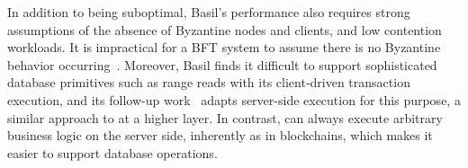 In addition to being suboptimal, Basil's performance also requires strong assumptions of the absence of Byzantine nodes and clients, and low contention workloads.
It is impractical for a BFT system to assume there is no Byzantine behavior occurring~\cite{bft-bft}.
 
Moreover, Basil finds it difficult to support sophisticated database primitives such as range reads with its client-driven transaction execution, and its follow-up work~\cite{suri2025pesto} adapts server-side execution for this purpose, a similar approach to \sys at a higher layer.
In contrast, \sys can always execute arbitrary business logic on the server side, inherently as in blockchains, which makes it easier to support database operations.